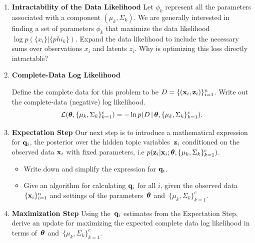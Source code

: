\documentclass[submit]{harvardml}
\begin{document}
\begin{problem}

  \begin{enumerate}

  \item \textbf{Intractability of the Data Likelihood} Let $\phi_k$
    represent all the parameters associated with a component
    $(\mu_k,\Sigma_k)$.  We are generally interested in finding a set
    of parameters $\phi_k$ that maximize the data likelihood $\log
    p(\{x_i\}|\{phi_k\})$.  Expand the data likelihood to include the
    necessary sums over observations $x_i$ and latents $z_i$.  Why is
    optimizing this loss directly intractable?
    
\item \textbf{Complete-Data Log Likelihood} 

    Define the complete data for this problem to be $D =
    \{(\mathbf{x}_i, \mathbf{z}_i)\}_{i=1}^n$. Write out the complete-data (negative) log likelihood.
    \[\mathcal{L}(\boldsymbol{\theta}, \{\mu_k,\Sigma_k\}^c_{k=1}) =  -\ln p(D \,|\,\boldsymbol{\theta},
    \{\mu_k,\Sigma_k\}^c_{k=1}).\] 


\item \textbf{Expectation Step}
Our next step is to introduce a mathematical expression for $\mathbf{q}_i$, the posterior over the hidden topic variables~$\mathbf{z}_i$ conditioned on the observed data $\mathbf{x}_i$ with fixed parameters, i.e $p(\mathbf{z}_i | \mathbf{x}_i; \boldsymbol{\theta}, \{ \mu_k,\Sigma_k \}^c_{k=1})$.

\begin{itemize}
\item  Write down and simplify the expression for $\mathbf{q}_i$. 
\item  Give an algorithm for calculating $\mathbf{q}_i$ for all $i$, given the observed data~$\{\mathbf{x}_i\}^n_{i=1}$ and settings of the parameters~$\boldsymbol{\theta}$ and~$\{ \mu_k,\Sigma_k  \}^c_{k=1}$.

\end{itemize}

\item \textbf{Maximization Step}
Using the~$\mathbf{q}_i$ estimates from the Expectation Step, derive an update for maximizing the expected complete data log likelihood in terms of~$\boldsymbol{\theta}$ and~$\{ \mu_k,\Sigma_k \}^c_{k=1}$.


\end{enumerate}
\end{problem}
\end{document}
